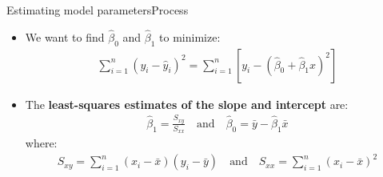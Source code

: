 \documentclass[xcolor=dvipsnames]{beamer}
\begin{document}
\begin{frame}{Estimating model parameters}{Process}
	\begin{itemize}
		\item We want to find $\hat{\beta}_0$ and $\hat{\beta}_1$ to minimize:
		\begin{gather*}
			\sum_{i=1}^{n} \left(y_i - \hat{y}_i\right)^2 = \sum_{i=1}^{n} \left[y_i - \left(\hat{\beta}_0 + \hat{\beta}_1 x\right)^2\right]
		\end{gather*}
		\item The \textbf{least-squares estimates of the slope and intercept} are:
		\begin{gather*}
			\hat{\beta}_1 = \frac{S_{xy}}{S_{xx}}\quad \text{and} \quad \hat{\beta}_0 = \bar{y}-\hat{\beta}_1 \bar{x}
		\end{gather*}
		where:
		\begin{gather*}
			S_{xy} = \sum_{i=1}^{n}(x_i - \bar{x})(y_i - \bar{y}) \quad \text{and} \quad S_{xx} = \sum_{i=1}^{n}\left(x_i - \bar{x}\right)^2
		\end{gather*}
	\end{itemize}
\end{frame}
\end{document}
